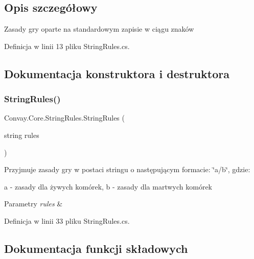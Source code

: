 \subsection{Opis szczegółowy}
Zasady gry oparte na standardowym zapisie w ciągu znaków 



Definicja w linii 13 pliku String\+Rules.\+cs.



\subsection{Dokumentacja konstruktora i destruktora}
\hypertarget{class_convay_1_1_core_1_1_string_rules_a7415d212989c204cf5135746b62c0bda}{}\label{class_convay_1_1_core_1_1_string_rules_a7415d212989c204cf5135746b62c0bda} 
\subsubsection{\texorpdfstring{String\+Rules()}{StringRules()}}
{\footnotesize\ttfamily Convay.\+Core.\+String\+Rules.\+String\+Rules (\begin{DoxyParamCaption}\item[{string}]{rules }\end{DoxyParamCaption})}



Przyjmuje zasady gry w postaci stringu o następującym formacie\+: \char`\"{}a/b\char`\"{}, gdzie\+: 

a -\/ zasady dla żywych komórek, b -\/ zasady dla martwych komórek 


\begin{DoxyParams}{Parametry}
{\em rules} & \\
\hline
\end{DoxyParams}


Definicja w linii 33 pliku String\+Rules.\+cs.



\subsection{Dokumentacja funkcji składowych}
\hypertarget{class_convay_1_1_core_1_1_string_rules_ae5cbc291877c0ef6b27302d64e7666ed}{}\label{class_convay_1_1_core_1_1_string_rules_ae5cbc291877c0ef6b27302d64e7666ed} 
